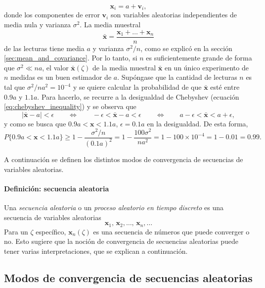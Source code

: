\documentclass[a4paper]{report}
\newcommand{\x}{\mathbf{x}}
\begin{document}
\[
 \x_i=a+\mathbf{v}_i,
\]
donde los componentes de error \(\mathbf{v}_i\) son variables aleatorias independientes de media nula y varianza \(\sigma^2\). La media muestral
\[
 \bar{\x}=\frac{\x_1+\dots+\x_n}{n}
\]
de las lecturas tiene media \(a\) y varianza \(\sigma^2/n\), como se explicó en la sección \ref{sec:mean_and_covariance}. Por lo tanto, si \(n\) es suficientemente grande de forma que \(\sigma^2\ll na\), el valor \(\bar{\x}(\zeta)\) de la media muestral \(\bar{\x}\) en un único experimento de \(n\) medidas es un buen estimador de \(a\). Supóngase que la cantidad de lecturas \(n\) es tal que \(\sigma^2/na^2=10^{-4}\) y se quiere calcular la probabilidad de que \(\bar{\x}\) esté entre \(0.9a\) y \(1.1a\). Para hacerlo, se recurre a la desigualdad de Chebyshev (ecuación \ref{eq:chebyshev_inequality}) y se observa que
\[
 |\bar{\x}-a|<\epsilon\qquad\Leftrightarrow\qquad -\epsilon<\bar{\x}-a<\epsilon
 \qquad\Leftrightarrow\qquad a-\epsilon<\bar{\x}<a+\epsilon,
\]
y como se busca que \(0.9a<\mathbf{\x}<1.1a\), \(\epsilon=0.1a\) en la desigualdad. De esta forma,
\[
  P\{0.9a<\mathbf{\x}<1.1a\}\geq 1-\frac{\sigma^2/n}{(0.1a)^2}=1-\frac{100\sigma^2}{na^2}=1-100\times10^{-4}=1-0.01=0.99.
\]

A continuación se definen los distintos modos de convergencia de secuencias de variables aleatorias.

\paragraph{Definición: secuencia aleatoria} Una \emph{secuencia aleatoria} o un \emph{proceso aleatorio en tiempo discreto} es una secuencia de variables aleatorias
\[
 \x_1,\,\x_2,\dots,\,\x_n,\dots
\]
Para un \(\zeta\) específico, \(\x_n(\zeta)\) es una secuencia de números que puede converger o no. Esto sugiere que la noción de convergencia de secuencias aleatorias puede tener varias interpretaciones, que se explican a continuación.

\subsection{Modos de convergencia de secuencias aleatorias}\label{sec:convergence_modes}
\end{document}
